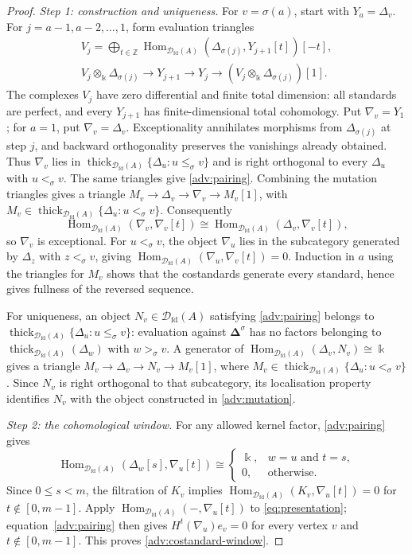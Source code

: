 \documentclass[11pt,a4paper]{article}
\newcommand{\D}{\mathcal D}
\newcommand{\ZZ}{\mathbb{Z}}
\newcommand{\std}{\Delta}
\newcommand{\costd}{\nabla}
\DeclareMathOperator{\fd}{fd}
\DeclareMathOperator{\Hom}{Hom}
\DeclareMathOperator{\thick}{thick}
\theoremstyle{plain}
\theoremstyle{definition}
\numberwithin{equation}{section}
\begin{document}
\begin{proof}
\noindent\textit{Step 1: construction and uniqueness.}
For $v=\sigma(a)$, start with $Y_a=\std_v$. For
$j=a-1,a-2,\ldots,1$, form evaluation triangles
\begin{equation}\label{adv:mutation}
 \begin{gathered}
 V_j=\bigoplus_{t\in\ZZ}
 \Hom_{\D_{\fd}(A)}(\std_{\sigma(j)},Y_{j+1}[t])[-t],\\
 V_j\otimes_{\Bbbk}\std_{\sigma(j)}\longrightarrow
 Y_{j+1}\longrightarrow Y_j\longrightarrow
 (V_j\otimes_{\Bbbk}\std_{\sigma(j)})[1].
 \end{gathered}
\end{equation}
The complexes $V_j$ have zero differential and finite total dimension:
all standards are perfect, and every $Y_{j+1}$ has finite-dimensional
total cohomology. Put $\costd_v=Y_1$; for $a=1$, put
$\costd_v=\std_v$.
Exceptionality annihilates morphisms from $\std_{\sigma(j)}$ at step
$j$, and backward orthogonality preserves the vanishings already
obtained. Thus $\costd_v$ lies in
$\thick_{\D_{\fd}(A)}\{\std_u:u\leq_\sigma v\}$ and is right
orthogonal to every $\std_u$ with $u<_\sigma v$.
The same triangles give \eqref{adv:pairing}.
Combining the mutation triangles gives a triangle
$M_v\to\std_v\to\costd_v\to M_v[1]$, with
$M_v\in\thick_{\D_{\fd}(A)}\{\std_u:u<_\sigma v\}$.
Consequently
\[
 \Hom_{\D_{\fd}(A)}(\costd_v,\costd_v[t])
 \cong\Hom_{\D_{\fd}(A)}(\std_v,\costd_v[t]),
\]
so $\costd_v$ is exceptional.
For $u<_\sigma v$, the object $\costd_u$ lies in the subcategory
generated by $\std_z$ with $z<_\sigma v$, giving
$\Hom_{\D_{\fd}(A)}(\costd_u,\costd_v[t])=0$.
Induction in $a$ using the triangles for $M_v$ shows that the
costandards generate every standard, hence gives fullness of the
reversed sequence.

For uniqueness, an object $N_v\in\D_{\fd}(A)$ satisfying \eqref{adv:pairing}
belongs to $\thick_{\D_{\fd}(A)}\{\std_u:u\leq_\sigma v\}$:
evaluation against $\boldsymbol\std^\sigma$ has no factors belonging
to $\thick_{\D_{\fd}(A)}(\std_w)$ with $w>_\sigma v$.
A generator of $\Hom_{\D_{\fd}(A)}(\std_v,N_v)\cong\Bbbk$ gives a
triangle $M_v\to\std_v\to N_v\to M_v[1]$, where
$M_v\in\thick_{\D_{\fd}(A)}\{\std_u:u<_\sigma v\}$.
Since $N_v$ is right orthogonal to that subcategory, its localisation
property identifies $N_v$ with the object constructed in
\eqref{adv:mutation}.

\noindent\textit{Step 2: the cohomological window.}
For any allowed kernel factor, \eqref{adv:pairing} gives
\begin{equation}\label{adv:factor-pairing}
 \Hom_{\D_{\fd}(A)}(\std_w[s],\costd_u[t])\cong
 \begin{cases}\Bbbk,&w=u\text{ and }t=s,\\0,&\text{otherwise}.
 \end{cases}
\end{equation}
Since $0\leq s<m$, the filtration of $K_v$ implies
$\Hom_{\D_{\fd}(A)}(K_v,\costd_u[t])=0$ for $t\notin[0,m-1]$.
Apply $\Hom_{\D_{\fd}(A)}(-,\costd_u[t])$ to
\eqref{eq:presentation}; equation~\eqref{adv:pairing} then gives
$H^t(\costd_u)e_v=0$ for every vertex $v$ and $t\notin[0,m-1]$.
This proves \eqref{adv:costandard-window}.


\end{proof}
\end{document}
